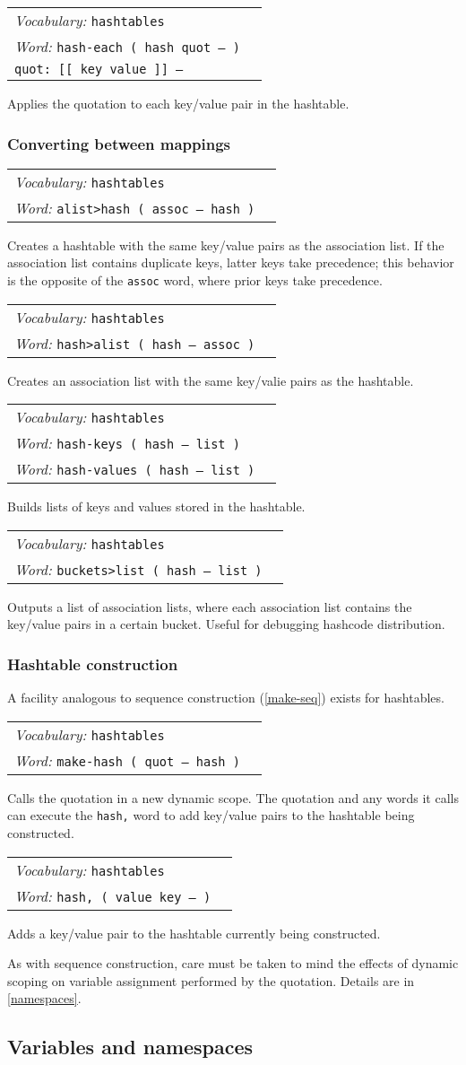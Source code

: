 \documentclass{book}
\newcommand{\vocabulary}[1]{\emph{Vocabulary:} \texttt{#1}&\\}
\newcommand{\ordinaryword}[2]{\index{\texttt{#1}}\emph{Word:} \texttt{#2}&\\}
\newcommand{\wordtable}[1]{


\begin{tabularx}{12cm}{lX}
\hline
#1
\hline
\end{tabularx}

}
\begin{document}
\wordtable{
\vocabulary{hashtables}
\ordinaryword{hash-each}{hash-each ( hash quot -- )}
\texttt{quot:~[[ key value ]] --}\\
}
Applies the quotation to each key/value pair in the hashtable.

\subsubsection{Converting between mappings}

\wordtable{
\vocabulary{hashtables}
\ordinaryword{alist>hash}{alist>hash ( assoc -- hash )}
}
Creates a hashtable with the same key/value pairs as the association list. If the association list contains duplicate keys, latter keys take precedence; this behavior is the opposite of the \texttt{assoc} word, where prior keys take precedence.
\wordtable{
\vocabulary{hashtables}
\ordinaryword{hash>alist}{hash>alist ( hash -- assoc )}
}
Creates an association list with the same key/valie pairs as the hashtable.
\wordtable{
\vocabulary{hashtables}
\ordinaryword{hash-keys}{hash-keys ( hash -- list )}
\ordinaryword{hash-values}{hash-values ( hash -- list )}
}
Builds lists of keys and values stored in the hashtable.
\wordtable{
\vocabulary{hashtables}
\ordinaryword{buckets>list}{buckets>list ( hash -- list )}
}
Outputs a list of association lists, where each association list contains the key/value pairs in a certain bucket. Useful for debugging hashcode distribution.

\subsubsection{Hashtable construction}

A facility analogous to sequence construction (\ref{make-seq}) exists for hashtables.

\wordtable{
\vocabulary{hashtables}
\ordinaryword{make-hash}{make-hash ( quot -- hash )}
}
Calls the quotation in a new dynamic scope. The quotation and any words it calls can execute the \texttt{hash,} word to add key/value pairs to the hashtable being constructed.
\wordtable{
\vocabulary{hashtables}
\ordinaryword{hash,}{hash,~( value key -- )}
}
Adds a key/value pair to the hashtable currently being constructed.

As with sequence construction, care must be taken to mind the effects of dynamic scoping on variable assignment performed by the quotation. Details are in \ref{namespaces}.

\subsection{\label{namespaces}Variables and namespaces}
\end{document}
